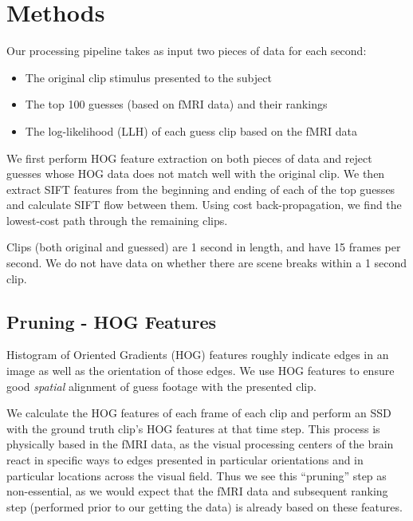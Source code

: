 
\section{Methods}

Our processing pipeline takes as input two pieces of data for each second:

\begin{itemize}
\item The original clip stimulus presented to the subject
\item The top 100 guesses (based on fMRI data) and their rankings
\item The log-likelihood (LLH) of each guess clip based on the fMRI data
\end{itemize}

We first perform HOG feature extraction on both pieces of data and reject guesses whose HOG data does not match well with the original clip.  We then extract SIFT features from the beginning and ending of each of the top guesses and calculate SIFT flow between them.  Using cost back-propagation, we find the lowest-cost path through the remaining clips.  

Clips (both original and guessed) are 1 second in length, and have 15 frames per second.  We do not have data on whether there are scene breaks within a 1 second clip.  

\subsection{Pruning - HOG Features}

Histogram of Oriented Gradients (HOG) features roughly indicate edges in an image as well as the orientation of those edges.  We use HOG features to ensure good \emph{spatial} alignment of guess footage with the presented clip.

We calculate the HOG features of each frame of each clip and perform an SSD with the ground truth clip's HOG features at that time step.  This process is physically based in the fMRI data, as the visual processing centers of the brain react in specific ways to edges presented in particular orientations and in particular locations across the visual field.  Thus we see this ``pruning'' step as non-essential, as we would expect that the fMRI data and subsequent ranking step (performed prior to our getting the data) is already based on these features.   

